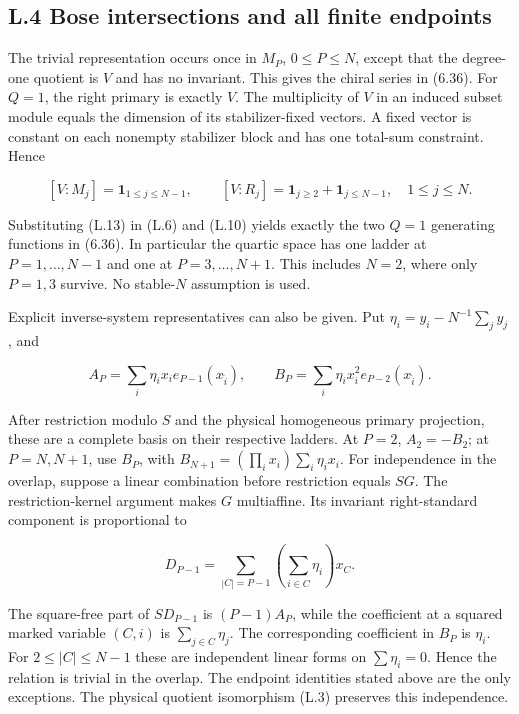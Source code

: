 \hypertarget{l.4-bose-intersections-and-all-finite-endpoints}{%
\subsection{L.4 Bose intersections and all finite endpoints}\label{l.4-bose-intersections-and-all-finite-endpoints}}

The trivial representation occurs once in \(M_P\), \(0\le P\le N\), except that the degree-one quotient is \(V\) and has no invariant. This gives the chiral series in (6.36). For \(Q=1\), the right primary is exactly \(V\). The multiplicity of \(V\) in an induced subset module equals the dimension of its stabilizer-fixed vectors. A fixed vector is constant on each nonempty stabilizer block and has one total-sum constraint. Hence

\[
[V:M_j]=\mathbf1_{1\le j\le N-1},\qquad
[V:R_j]=\mathbf1_{j\ge2}+\mathbf1_{j\le N-1},\quad1\le j\le N.
\tag{L.13}
\]

Substituting (L.13) in (L.6) and (L.10) yields exactly the two \(Q=1\) generating functions in (6.36). In particular the quartic space has one ladder at \(P=1,\ldots,N-1\) and one at \(P=3,\ldots,N+1\). This includes \(N=2\), where only \(P=1,3\) survive. No stable-\(N\) assumption is used.

Explicit inverse-system representatives can also be given. Put \(\eta_i=y_i-N^{-1}\sum_jy_j\), and

\[
A_P=\sum_i\eta_ix_i e_{P-1}(x_{\widehat i}),\qquad
B_P=\sum_i\eta_ix_i^2e_{P-2}(x_{\widehat i}).
\tag{L.14}
\]

After restriction modulo \(S\) and the physical homogeneous primary projection, these are a complete basis on their respective ladders. At \(P=2\), \(A_2=-B_2\); at \(P=N,N+1\), use \(B_P\), with \(B_{N+1}=(\prod_i x_i)\sum_i\eta_ix_i\). For independence in the overlap, suppose a linear combination before restriction equals \(SG\). The restriction-kernel argument makes \(G\) multiaffine. Its invariant right-standard component is proportional to

\[
D_{P-1}=\sum_{|C|=P-1}\left(\sum_{i\in C}\eta_i\right)x_C.
\]

The square-free part of \(SD_{P-1}\) is \((P-1)A_P\), while the coefficient at a squared marked variable \((C,i)\) is \(\sum_{j\in C}\eta_j\). The corresponding coefficient in \(B_P\) is \(\eta_i\). For \(2\le|C|\le N-1\) these are independent linear forms on \(\sum\eta_i=0\). Hence the relation is trivial in the overlap. The endpoint identities stated above are the only exceptions. The physical quotient isomorphism (L.3) preserves this independence.

